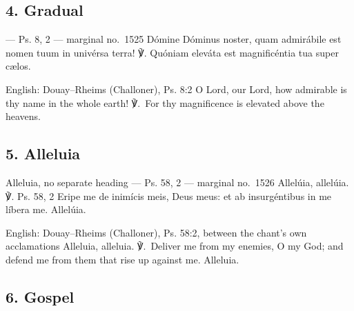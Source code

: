 
\elementguard
\subsection*{4. Gradual }

\begin{appointedlatin}{ --- Ps. 8, 2 --- marginal no.\ 1525}
Dómine Dóminus noster, quam admirábile est nomen tuum in univérsa terra! ℣.
Quóniam eleváta est magnificéntia tua super cælos.
\end{appointedlatin}

\begin{namedtranslation}{English: Douay--Rheims (Challoner), Ps. 8:2}
O Lord, our Lord, how admirable is thy name in the whole earth! ℣.~For thy
magnificence is elevated above the heavens.
\end{namedtranslation}

\elementguard
\subsection*{5. Alleluia }

\begin{appointedlatin}{Alleluia, no separate heading --- Ps. 58, 2 --- marginal no.\ 1526}
Allelúia, allelúia. ℣. \textnormal{Ps. 58, 2} Eripe me de inimícis meis, Deus meus:
et ab insurgéntibus in me líbera me. Allelúia.
\end{appointedlatin}

\begin{namedtranslation}{English: Douay--Rheims (Challoner), Ps. 58:2, between the chant's own acclamations}
Alleluia, alleluia. ℣.~Deliver me from my enemies, O my God; and defend me
from them that rise up against me. Alleluia.
\end{namedtranslation}

\elementguard
\subsection*{6. Gospel }

